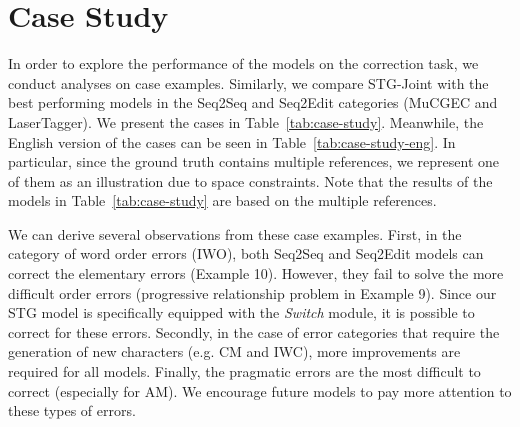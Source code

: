 \documentclass[11pt]{article}
\begin{document}
\section{Case Study}
\label{appendix:case-study}

In order to explore the performance of the models on the correction task, we conduct analyses on case examples. Similarly, we compare STG-Joint with the best performing models in the Seq2Seq and Seq2Edit categories (MuCGEC and LaserTagger). We present the cases in Table~\ref{tab:case-study}. Meanwhile, the English version of the cases can be seen in Table~\ref{tab:case-study-eng}. In particular, since the ground truth contains multiple references, we represent one of them as an illustration due to space constraints. Note that the results of the models in Table~\ref{tab:case-study} are based on the multiple references.

We can derive several observations from these case examples. First, in the category of word order errors (IWO), both Seq2Seq and Seq2Edit models can correct the elementary errors (Example 10). However, they fail to solve the more difficult order errors (progressive relationship problem in Example 9). Since our STG model is specifically equipped with the \emph{Switch} module, it is possible to correct for these errors. Secondly, in the case of error categories that require the generation of new 
characters (e.g. CM and IWC), more improvements are required for all models. Finally, the pragmatic errors are the most difficult to correct (especially for AM). We encourage future models to pay more attention to these types of errors.
\end{document}

